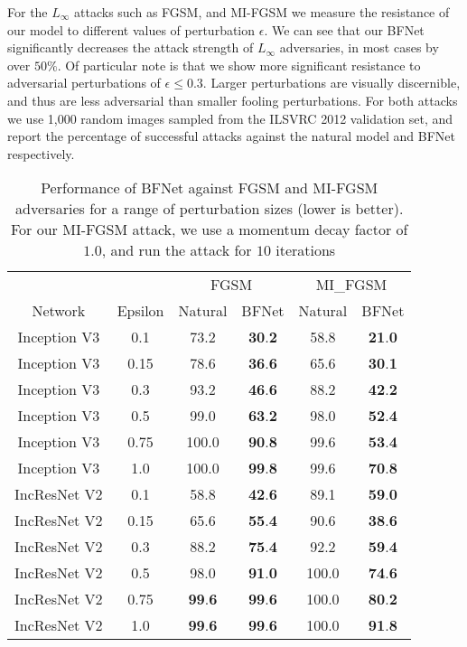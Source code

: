 \documentclass{article} %
\begin{document}
For the $L_\infty$ attacks such as FGSM, and MI-FGSM we measure the resistance of our model to different values of perturbation $\epsilon$. We can see that our BFNet significantly decreases the attack strength of $L_\infty$ adversaries, in most cases by over $50\%$. Of particular note is that we show more significant resistance to adversarial perturbations of $\epsilon \leq 0.3$. Larger perturbations are visually discernible, and thus are less adversarial than smaller fooling perturbations. For both attacks we use 1,000 random images sampled from the ILSVRC 2012 validation set, and report the percentage of successful attacks against the natural model and BFNet respectively.
\begin{table}[htb]
\begin{center}
\begin{tabular}{cccccc} \toprule
& & \multicolumn{2}{c}{FGSM} & \multicolumn{2}{c}{MI\_FGSM} \\
      {Network} & {Epsilon} & {Natural} & {BFNet} & Natural & BFNet \\ \midrule{Inception V3}  & 0.1  & 73.2  &  \textbf{30}.\textbf{2} & 58.8  &  \textbf{21}.\textbf{0}\\{Inception V3}  & 0.15 & 78.6  &  \textbf{36}.\textbf{6} & 65.6  &  \textbf{30}.\textbf{1} \\
	  {Inception V3}  & 0.3  & 93.2  &  \textbf{46}.\textbf{6} &88.2  &  \textbf{42}.\textbf{2}\\{Inception V3}  & 0.5  & 99.0  &  \textbf{63}.\textbf{2}& 98.0  &  \textbf{52}.\textbf{4} \\
	  {Inception V3}  & 0.75 & 100.0 &  \textbf{90}.\textbf{8} & 99.6  &  \textbf{53}.\textbf{4}   \\
	  {Inception V3}  & 1.0  & 100.0 &  \textbf{99}.\textbf{8} &99.6  &  \textbf{70}.\textbf{8}\\
	  \noalign{\smallskip\hrule\medskip}
      {IncResNet V2}  & 0.1  & 58.8  &  \textbf{42}.\textbf{6} &89.1  &  \textbf{59}.\textbf{0}\\{IncResNet V2}  & 0.15 & 65.6  &  \textbf{55}.\textbf{4} &90.6  &  \textbf{38}.\textbf{6}\\{IncResNet V2}  & 0.3  & 88.2  &  \textbf{75}.\textbf{4} &92.2  &  \textbf{59}.\textbf{4}\\{IncResNet V2}  & 0.5  & 98.0  &  \textbf{91}.\textbf{0} &100.0 &  \textbf{74}.\textbf{6}\\{IncResNet V2}  & 0.75 & \textbf{99}.\textbf{6}  &  \textbf{99}.\textbf{6} &100.0 &  \textbf{80}.\textbf{2} \\
      {IncResNet V2}  & 1.0  & \textbf{99}.\textbf{6}  &  \textbf{99}.\textbf{6} & 100.0 &  \textbf{91}.\textbf{8}\\ \bottomrule
\end{tabular}
\end{center}
\vskip -0.1in
\caption{ Performance of BFNet against FGSM and MI-FGSM adversaries for a range of perturbation sizes (lower is better). For our MI-FGSM attack, we use a momentum decay factor of $1.0$, and run the attack for $10$ iterations} \label{tab:fgsm_in}
\vskip -0.1in
\end{table}
\end{document}
